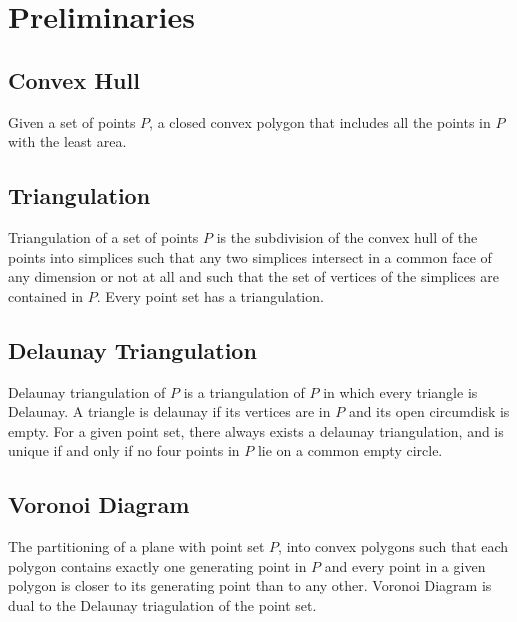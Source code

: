 \documentclass[12pt,a4paper]{article}
\begin{document}

\newpage
\tableofcontents

\newpage
\listoffigures

\section{Preliminaries}

\subsection{Convex Hull} Given a set of points $P$, a closed convex polygon that includes all the points in $P$ with the least area.

\subsection{Triangulation}
Triangulation of a set of points $P$ is the subdivision of the convex hull of the points into simplices such that any two simplices intersect in a common face of any dimension or not at all and such that the set of vertices of the simplices are contained in $P$. Every point set has a triangulation. 

\subsection{Delaunay Triangulation}
Delaunay triangulation of $P$ is a triangulation of $P$ in which every triangle is Delaunay. A triangle is delaunay if its vertices are in $P$ and its open circumdisk is empty. For a given point set, there always exists a delaunay triangulation, and is unique if and only if no four points in $P$ lie on a common empty circle.

\subsection{Voronoi Diagram}
The partitioning of a plane with point set $P$, into convex polygons such that each polygon contains exactly one generating point in $P$ and every point in a given polygon is closer to its generating point than to any other. Voronoi Diagram is dual to the Delaunay triagulation of the point set.

%
\end{document}
